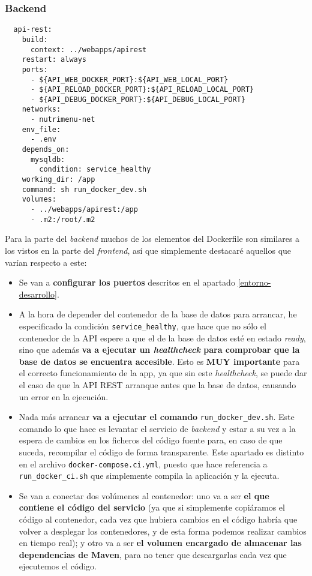 \subsubsection{Backend}

\begin{lstlisting}
  api-rest:
    build:
      context: ../webapps/apirest
    restart: always
    ports:
      - ${API_WEB_DOCKER_PORT}:${API_WEB_LOCAL_PORT}
      - ${API_RELOAD_DOCKER_PORT}:${API_RELOAD_LOCAL_PORT}
      - ${API_DEBUG_DOCKER_PORT}:${API_DEBUG_LOCAL_PORT}
    networks:
      - nutrimenu-net
    env_file:
      - .env
    depends_on:
      mysqldb:
        condition: service_healthy
    working_dir: /app
    command: sh run_docker_dev.sh
    volumes:
      - ../webapps/apirest:/app
      - .m2:/root/.m2
\end{lstlisting}

Para la parte del \textit{backend} muchos de los elementos del Dockerfile son similares a los vistos en la parte del \textit{frontend}, así que simplemente destacaré aquellos que varían respecto a este:

\begin{itemize}
	\item Se van a \textbf{configurar los puertos} descritos en el apartado \ref{entorno-desarrollo}.
	\item A la hora de depender del contenedor de la base de datos para arrancar, he especificado la condición \verb,service_healthy,, que hace que no sólo el contenedor de la API espere a que el de la base de datos esté en estado \textit{ready}, sino que además \textbf{va a ejecutar un \textit{healthcheck} para comprobar que la base de datos se encuentra accesible}. Esto es \textbf{MUY importante} para el correcto funcionamiento de la app, ya que sin este \textit{healthcheck}, se puede dar el caso de que la API REST arranque antes que la base de datos, causando un error en la ejecución.
	\item Nada más arrancar \textbf{va a ejecutar el comando} \verb,run_docker_dev.sh,. Este comando lo que hace es levantar el servicio de \textit{backend} y estar a su vez a la espera de cambios en los ficheros del código fuente para, en caso de que suceda, recompilar el código de forma transparente. Este apartado es distinto en el archivo \verb,docker-compose.ci.yml,, puesto que hace referencia a \verb,run_docker_ci.sh, que simplemente compila la aplicación y la ejecuta.
	\item Se van a conectar dos volúmenes al contenedor: uno va a ser \textbf{el que contiene el código del servicio} (ya que si simplemente copiáramos el código al contenedor, cada vez que hubiera cambios en el código habría que volver a desplegar los contenedores, y de esta forma podemos realizar cambios en tiempo real); y otro va a ser \textbf{el volumen encargado de almacenar las dependencias de Maven}, para no tener que descargarlas cada vez que ejecutemos el código.
\end{itemize}

